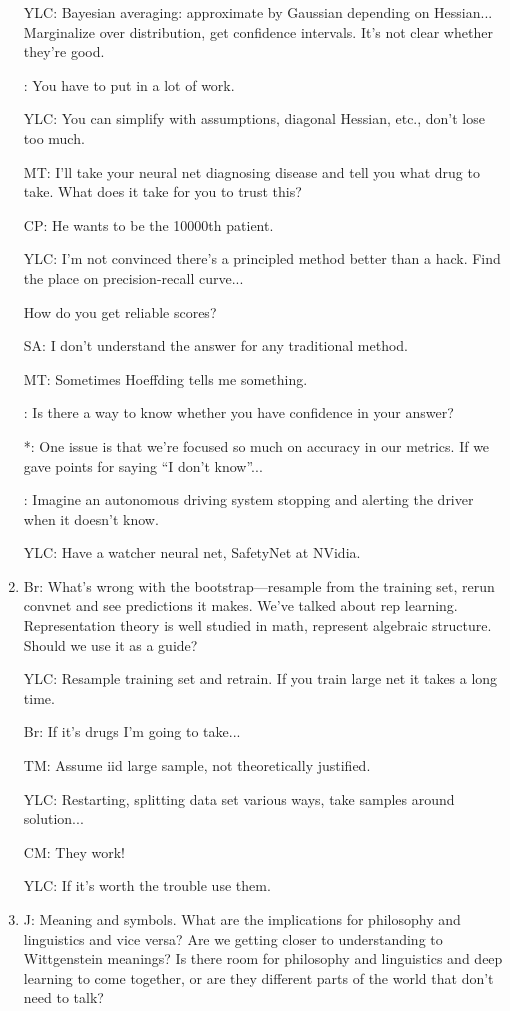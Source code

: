 \begin{enumerate}
YLC: Bayesian averaging: approximate by Gaussian depending on Hessian...  Marginalize over distribution, get confidence intervals. It's not clear whether they're good.

: You have to put in a lot of work.

YLC: You can simplify with assumptions, diagonal Hessian, etc., don't lose too much.

MT: I'll take your neural net  diagnosing disease and tell you what drug to take. What does it take for you to trust this?

CP: He wants to be the 10000th patient.

YLC: I'm not convinced there's a principled method better than a hack. Find the place on precision-recall curve...

How do you get reliable scores?

SA: I don't understand the answer for any traditional method.

MT: Sometimes Hoeffding tells me something.

: Is there a way to know whether you have confidence in your answer? 

*: One issue is that we're focused so much on accuracy in our metrics. If we gave points for saying ``I don't know''... 

: Imagine an autonomous driving system stopping and alerting the driver when it doesn't know.

YLC: Have a watcher neural net, SafetyNet at NVidia.
\item
Br: What's wrong with the bootstrap---resample from the training set, rerun convnet and see predictions it makes. We've talked about rep learning. Representation theory is well studied in math, represent algebraic structure. Should we use it as a guide?

YLC: Resample training set and retrain. If you train large net it takes a long time.

Br: If it's drugs I'm going to take...

TM: Assume iid large sample, not theoretically justified.

YLC: Restarting, splitting data set various ways, take samples around solution...

CM: They work!

YLC: If it's worth the trouble use them.
\item
J: Meaning and symbols. What are the implications for philosophy and linguistics and vice versa? Are we getting closer to understanding to Wittgenstein meanings? Is there room for philosophy and linguistics and deep learning to come together, or are they different parts of the world that don't need to talk?


\end{enumerate}
